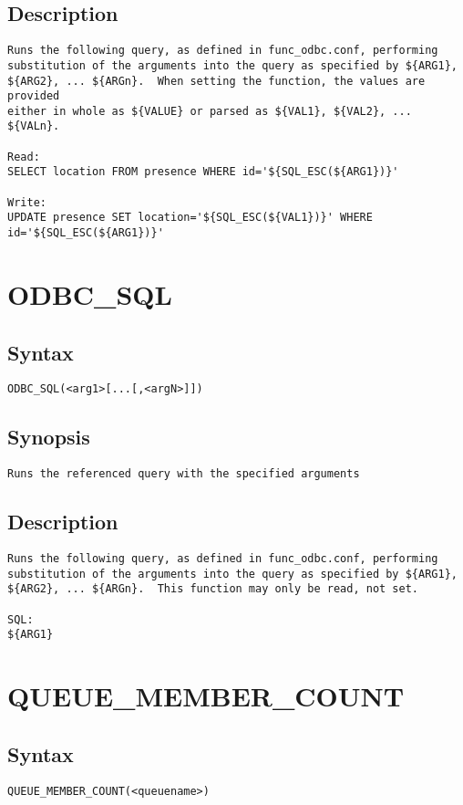 \subsection{Description}
\begin{verbatim}
Runs the following query, as defined in func_odbc.conf, performing
substitution of the arguments into the query as specified by ${ARG1},
${ARG2}, ... ${ARGn}.  When setting the function, the values are provided
either in whole as ${VALUE} or parsed as ${VAL1}, ${VAL2}, ... ${VALn}.

Read:
SELECT location FROM presence WHERE id='${SQL_ESC(${ARG1})}'

Write:
UPDATE presence SET location='${SQL_ESC(${VAL1})}' WHERE id='${SQL_ESC(${ARG1})}'

\end{verbatim}


\section{ODBC\_SQL}
\subsection{Syntax}
\begin{verbatim}
ODBC_SQL(<arg1>[...[,<argN>]])
\end{verbatim}
\subsection{Synopsis}
\begin{verbatim}
Runs the referenced query with the specified arguments
\end{verbatim}
\subsection{Description}
\begin{verbatim}
Runs the following query, as defined in func_odbc.conf, performing
substitution of the arguments into the query as specified by ${ARG1},
${ARG2}, ... ${ARGn}.  This function may only be read, not set.

SQL:
${ARG1}

\end{verbatim}


\section{QUEUE\_MEMBER\_COUNT}
\subsection{Syntax}
\begin{verbatim}
QUEUE_MEMBER_COUNT(<queuename>)
\end{verbatim}
